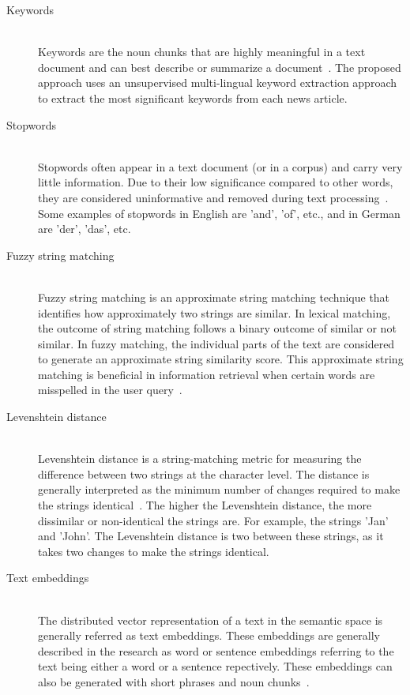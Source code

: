 \begin{description}
	\item[Keywords] \hfill \\ Keywords are the noun chunks that are highly meaningful in a text document and can best describe or summarize a document~\cite{beliga2014keyword}. The proposed approach uses an unsupervised multi-lingual keyword extraction approach to extract the most significant keywords from each news article.
	
	
	 \item[Stopwords] \hfill \\ Stopwords often appear in a text document (or in a corpus) and carry very little information. Due to their low significance compared to other words, they are considered uninformative and removed during text processing~\cite{sarica2021stopwords}. Some examples of stopwords in English are 'and', 'of', etc., and in German are 'der', 'das', etc.
	
	\item[Fuzzy string matching] \hfill \\ Fuzzy string matching is an approximate string matching technique that identifies how approximately two strings are similar. In lexical matching, the outcome of string matching follows a binary outcome of similar or not similar. In fuzzy matching, the individual parts of the text are considered to generate an approximate string similarity score. This approximate string matching is beneficial in information retrieval when certain words are misspelled in the user query~\cite{redisWhatFuzzy}.
	
	\item[Levenshtein distance] \hfill \\ Levenshtein distance is a string-matching metric for measuring the difference between two strings at the character level. The distance is generally interpreted as the minimum number of changes required to make the strings identical~\cite{redisWhatFuzzy}. The higher the Levenshtein distance, the more dissimilar or non-identical the strings are. For example, the strings 'Jan' and 'John'. The Levenshtein distance is two between these strings, as it takes two changes to make the strings identical.
	
	\item[Text embeddings] \hfill \\ The distributed vector representation of a text
	in the semantic space is generally referred as text embeddings. These embeddings are generally described in the research as word or sentence embeddings referring to the text being either a word or a sentence repectively. These embeddings can
	also be generated with short phrases and noun chunks~\cite{cer2018universal, yang2019multilingual}.
	

\end{description}
